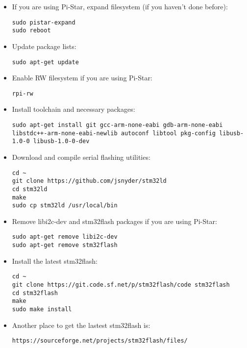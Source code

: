 \documentclass[]{article}
\begin{document}
\begin{itemize}[leftmargin=*]
	
\item If you are using Pi-Star, expand filesystem (if you haven't done before):
\begin{lstlisting}[style=DOS]
sudo pistar-expand
sudo reboot
\end{lstlisting}

\item Update package lists:
\begin{lstlisting}[style=DOS]
sudo apt-get update
\end{lstlisting}

\item Enable RW filesystem if you are using Pi-Star:
\begin{lstlisting}[style=DOS]
rpi-rw
\end{lstlisting}

\item Install toolchain and necessary packages:
\begin{lstlisting}[style=DOS]
sudo apt-get install git gcc-arm-none-eabi gdb-arm-none-eabi libstdc++-arm-none-eabi-newlib autoconf libtool pkg-config libusb-1.0-0 libusb-1.0-0-dev
\end{lstlisting}

\item Download and compile serial flashing utilities:
\begin{lstlisting}[style=DOS]
cd ~
git clone https://github.com/jsnyder/stm32ld
cd stm32ld
make
sudo cp stm32ld /usr/local/bin
\end{lstlisting}

\item Remove libi2c-dev and stm32flash packages if you are using Pi-Star:
\begin{lstlisting}[style=DOS]
sudo apt-get remove libi2c-dev
sudo apt-get remove stm32flash
\end{lstlisting}

\item Install the latest stm32flash:
\begin{lstlisting}[style=DOS]
cd ~
git clone https://git.code.sf.net/p/stm32flash/code stm32flash
cd stm32flash
make
sudo make install
\end{lstlisting}

\item Another place to get the lastest stm32flash is:

\begin{verbatim}
https://sourceforge.net/projects/stm32flash/files/
\end{verbatim}

\end{itemize}
\end{document}
